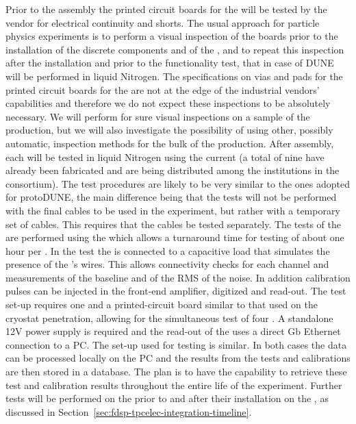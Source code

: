 Prior to the assembly the printed circuit boards for the
 will be tested by the vendor for electrical
continuity and shorts. The usual approach for particle physics
experiments is to perform a visual inspection of the boards
prior to the installation of the discrete components and of
the , and to repeat this inspection after the
installation and prior to the functionality test, that in
case of DUNE will be performed in liquid Nitrogen. The
specifications on vias and pads for the printed circuit
boards for the  are not at the edge of the
industrial vendors' capabilities and therefore we do not
expect these inspections to be absolutely necessary. We will
perform for sure visual inspections on a sample of the 
production, but we will also investigate the possibility
of using other, possibly automatic, inspection methods for
the bulk of the production. After assembly, 
each  will be tested in liquid Nitrogen using
the current  (a total of nine have already been
fabricated and are being distributed among the institutions
in the consortium). The test procedures are likely to be
very similar to the ones adopted for protoDUNE, the main
difference being that the tests will not be performed with
the final cables to be used in the experiment, but rather
with a temporary set of cables. This requires that the 
cables be tested separately. The tests of the 
are performed using the  which allows a turnaround
time for testing of about one hour per . In the
test the  is connected to a capacitive load that
simulates the presence of the 's wires. This allows
connectivity checks for each channel and measurements of
the baseline and of the RMS of the noise. In addition calibration 
pulses can be injected in the front-end amplifier, digitized
and read-out. The test set-up requires one  and
a printed-circuit board similar to that used on the cryostat
penetration, allowing for the simultaneous test of four .
A standalone 12V power supply is required and the read-out
of the  uses a direct Gb Ethernet connection to
a PC. The set-up used for  testing is similar.
In both cases the data can be processed locally on the PC
and the results from the tests and calibrations are then stored 
in a database. The plan is to have the capability to retrieve  
these test and calibration results throughout the entire life
of the experiment. Further tests will be performed on the 
prior to and after their installation on the , as
discussed in Section~\ref{sec:fdsp-tpcelec-integration-timeline}.


